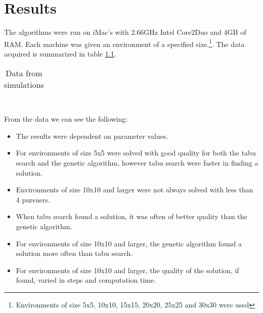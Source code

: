 \chapter{Results}
The algorithms were run on iMac's with 2.66GHz Intel Core2Duo and 4GB of RAM. Each machine was given an environment of a specified size.\footnote{Environments of size 5x5, 10x10, 15x15, 20x20, 25x25 and 30x30 were used}. The data acquired is summarized in table \ref{SimData}.
\begin{table}[t!hb]
\begin{tabular}{| c | r | r | r | r | r | r | r | r | }
\hline
 
\hline
\end{tabular}
\caption{Data from simulations}
\label{SimData}
\end{table}
\\ From the data we can see the following:
\begin{itemize}
\item{The results were dependent on parameter values.}
\item{For environments of size 5x5 were solved with good quality for both the tabu search and the genetic algorithm, however tabu search were faster in finding a solution.}
\item{Environments of size 10x10 and larger were not always solved with less than 4 pursuers.}
\item{When tabu search found a solution, it was often of better quality than the genetic algorithm.}
\item{For environments of size 10x10 and larger, the genetic algorithm found a solution more often than tabu search.}
\item{For environments of size 10x10 and larger, the quality of the solution, if found, varied in steps and computation time.}
\end{itemize}

